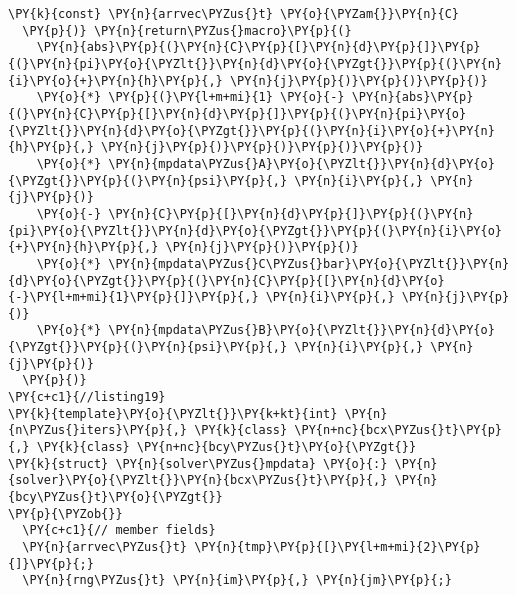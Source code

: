 \begin{Verbatim}[commandchars=\\\{\}]
    \PY{k}{const} \PY{n}{arrvec\PYZus{}t} \PY{o}{\PYZam{}}\PY{n}{C}
  \PY{p}{)} \PY{n}{return\PYZus{}macro}\PY{p}{(}
    \PY{n}{abs}\PY{p}{(}\PY{n}{C}\PY{p}{[}\PY{n}{d}\PY{p}{]}\PY{p}{(}\PY{n}{pi}\PY{o}{\PYZlt{}}\PY{n}{d}\PY{o}{\PYZgt{}}\PY{p}{(}\PY{n}{i}\PY{o}{+}\PY{n}{h}\PY{p}{,} \PY{n}{j}\PY{p}{)}\PY{p}{)}\PY{p}{)} 
    \PY{o}{*} \PY{p}{(}\PY{l+m+mi}{1} \PY{o}{-} \PY{n}{abs}\PY{p}{(}\PY{n}{C}\PY{p}{[}\PY{n}{d}\PY{p}{]}\PY{p}{(}\PY{n}{pi}\PY{o}{\PYZlt{}}\PY{n}{d}\PY{o}{\PYZgt{}}\PY{p}{(}\PY{n}{i}\PY{o}{+}\PY{n}{h}\PY{p}{,} \PY{n}{j}\PY{p}{)}\PY{p}{)}\PY{p}{)}\PY{p}{)} 
    \PY{o}{*} \PY{n}{mpdata\PYZus{}A}\PY{o}{\PYZlt{}}\PY{n}{d}\PY{o}{\PYZgt{}}\PY{p}{(}\PY{n}{psi}\PY{p}{,} \PY{n}{i}\PY{p}{,} \PY{n}{j}\PY{p}{)} 
    \PY{o}{-} \PY{n}{C}\PY{p}{[}\PY{n}{d}\PY{p}{]}\PY{p}{(}\PY{n}{pi}\PY{o}{\PYZlt{}}\PY{n}{d}\PY{o}{\PYZgt{}}\PY{p}{(}\PY{n}{i}\PY{o}{+}\PY{n}{h}\PY{p}{,} \PY{n}{j}\PY{p}{)}\PY{p}{)} 
    \PY{o}{*} \PY{n}{mpdata\PYZus{}C\PYZus{}bar}\PY{o}{\PYZlt{}}\PY{n}{d}\PY{o}{\PYZgt{}}\PY{p}{(}\PY{n}{C}\PY{p}{[}\PY{n}{d}\PY{o}{-}\PY{l+m+mi}{1}\PY{p}{]}\PY{p}{,} \PY{n}{i}\PY{p}{,} \PY{n}{j}\PY{p}{)}
    \PY{o}{*} \PY{n}{mpdata\PYZus{}B}\PY{o}{\PYZlt{}}\PY{n}{d}\PY{o}{\PYZgt{}}\PY{p}{(}\PY{n}{psi}\PY{p}{,} \PY{n}{i}\PY{p}{,} \PY{n}{j}\PY{p}{)}
  \PY{p}{)} 
\PY{c+c1}{//listing19}
\PY{k}{template}\PY{o}{\PYZlt{}}\PY{k+kt}{int} \PY{n}{n\PYZus{}iters}\PY{p}{,} \PY{k}{class} \PY{n+nc}{bcx\PYZus{}t}\PY{p}{,} \PY{k}{class} \PY{n+nc}{bcy\PYZus{}t}\PY{o}{\PYZgt{}}
\PY{k}{struct} \PY{n}{solver\PYZus{}mpdata} \PY{o}{:} \PY{n}{solver}\PY{o}{\PYZlt{}}\PY{n}{bcx\PYZus{}t}\PY{p}{,} \PY{n}{bcy\PYZus{}t}\PY{o}{\PYZgt{}}
\PY{p}{\PYZob{}}
  \PY{c+c1}{// member fields}
  \PY{n}{arrvec\PYZus{}t} \PY{n}{tmp}\PY{p}{[}\PY{l+m+mi}{2}\PY{p}{]}\PY{p}{;}
  \PY{n}{rng\PYZus{}t} \PY{n}{im}\PY{p}{,} \PY{n}{jm}\PY{p}{;}


\end{Verbatim}
